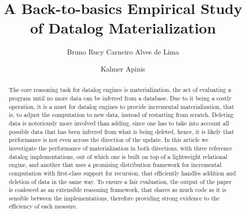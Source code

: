 \documentclass[manuscript,screen,review]{acmart}
\theoremstyle{definition}
\begin{document}
\title{A Back-to-basics Empirical Study of Datalog Materialization}

\author{Bruno Rucy Carneiro Alves de Lima}

\author{Kalmer Apinis}

\renewcommand{\shortauthors}{Trovato and Tobin, et al.}

\begin{abstract}
	The core reasoning task for datalog engines is materialization, the act of evaluating a program until no more data can be inferred from a database. Due to it being a costly operation, it is a must for datalog engines to provide incremental materialization, that is, to adjust the computation to new data, instead of restarting from scratch.
	Deleting data is notoriously more involved than adding, since one has to take into account all possible data that has been inferred from what is being deleted, hence, it is likely that performance is not even across the direction of the update.
	In this article we investigate the performance of materialization in both directions, with three reference datalog implementations, out of which one is built on top of a lightweight relational engine, and another that uses a promising distribution framework for incremental computation with first-class support for recursion, that efficiently handles addition and deletion of data in the same way.
	To ensure a fair evaluation, the output of the paper is coalesced as an extensible reasoning framework, that shares as much code as it is sensible between the implementations, therefore providing strong evidence to the efficiency of each measure.
\end{abstract}
\end{document}

